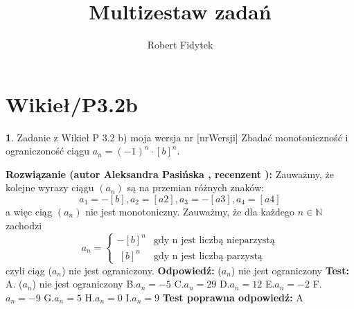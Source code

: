 \documentclass[12pt, a4paper]{article}
\title{Multizestaw zadań}
\author{Robert Fidytek}
\date{}
\theoremstyle{definition} %
\newtheorem{zad}{}
\newcommand{\kategoria}[1]{\section{#1}} %
\newcommand{\zadStart}[1]{\begin{zad}#1\newline} %
\newcommand{\zadStop}{\end{zad}}   %
\newcommand{\rozwStart}[2]{\noindent \textbf{Rozwiązanie (autor #1 , recenzent #2): }\newline} %
\newcommand{\rozwStop}{\newline}                                            %
\newcommand{\odpStart}{\noindent \textbf{Odpowiedź:}\newline}    %
\newcommand{\odpStop}{\newline}                                             %
\newcommand{\testStart}{\noindent \textbf{Test:}\newline} %
\newcommand{\testStop}{\newline} %
\newcommand{\kluczStart}{\noindent \textbf{Test poprawna odpowiedź:}\newline} %
\newcommand{\kluczStop}{\newline} %
\begin{document}
\maketitle


\kategoria{Wikieł/P3.2b}
\zadStart{Zadanie z Wikieł P 3.2 b) moja wersja nr [nrWersji]}
Zbadać monotoniczność i ograniczoność ciągu $a_{n}=(-1)^n\cdot[b]^n$.
\zadStop
\rozwStart{Aleksandra Pasińska}{}
Zauważmy, że kolejne wyrazy ciągu $(a_{n})$ są na przemian różnych znaków:
$$a_{1}=-[b], a_{2}=[a2],a_{3}=-[a3],a_{4}=[a4]$$ 
a więc ciąg $(a_{n})$ nie jest monotoniczny.
Zauważmy, że dla każdego $n \in \mathbb{N}$ zachodzi 
$$a_{n}=\left\{ \begin{array}{ll}-[b]^n & \textrm{gdy n jest liczbą nieparzystą}\\ \
      [b]^n & \textrm{gdy n jest liczbą parzystą}\end{array} \right.$$
czyli ciąg ($a_{n}$) nie jest ograniczony.
\rozwStop
\odpStart
($a_{n}$) nie jest ograniczony
\odpStop
\testStart
A. ($a_{n}$) nie jest ograniczony
B.$a_{n}=-5$
C.$a_{n}=29$
D.$a_{n}=12$
E.$a_{n}=-2$
F.$a_{n}=-9$
G.$a_{n}=5$
H.$a_{n}=0$
I.$a_{n}=9$
\testStop
\kluczStart
A
\kluczStop
\end{document}
